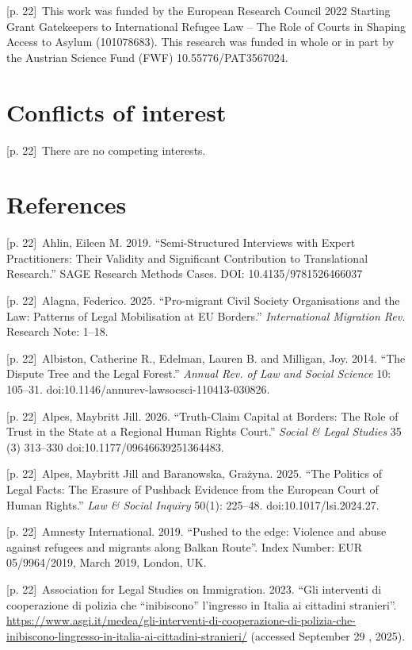 \documentclass[10pt,a4paper]{article}
\begin{document}
{\scriptsize\color{gray} [p. 22]}\ This work was funded by the European Research Council 2022 Starting Grant Gatekeepers to International Refugee Law – The Role of Courts in Shaping Access to Asylum (101078683). This research was funded in whole or in part by the Austrian Science Fund (FWF) 10.55776/PAT3567024.\par
{}\section*{Conflicts of interest}
{\scriptsize\color{gray} [p. 22]}\ There are no competing interests.\par
{}\section*{References}
{\scriptsize\color{gray} [p. 22]}\ Ahlin, Eileen M. 2019. “Semi-Structured Interviews with Expert Practitioners: Their Validity and Significant Contribution to Translational Research.” SAGE Research Methods Cases. DOI: 10.4135/9781526466037\par
{\scriptsize\color{gray} [p. 22]}\ Alagna, Federico. 2025. “Pro-migrant Civil Society Organisations and the Law: Patterns of Legal Mobilisation at EU Borders.” \textit{International Migration Rev.} Research Note: 1–18.\par
{\scriptsize\color{gray} [p. 22]}\ Albiston, Catherine R., Edelman, Lauren B. and Milligan, Joy. 2014. “The Dispute Tree and the Legal Forest.” \textit{Annual Rev. of Law and Social Science} 10: 105–31. doi:10.1146/annurev-lawsocsci-110413-030826.\par
{\scriptsize\color{gray} [p. 22]}\ Alpes, Maybritt Jill. 2026. “Truth-Claim Capital at Borders: The Role of Trust in the State at a Regional Human Rights Court.” \textit{Social \& Legal Studies} 35 (3) 313–330 doi:10.1177/09646639251364483.\par
{\scriptsize\color{gray} [p. 22]}\ Alpes, Maybritt Jill and Baranowska, Grażyna. 2025. “The Politics of Legal Facts: The Erasure of Pushback Evidence from the European Court of Human Rights.” \textit{Law \& Social Inquiry} 50(1): 225–48. doi:10.1017/lsi.2024.27.\par
{\scriptsize\color{gray} [p. 22]}\ Amnesty International. 2019. “Pushed to the edge: Violence and abuse against refugees and migrants along Balkan Route”. Index Number: EUR 05/9964/2019, March 2019, London, UK.\par
{\scriptsize\color{gray} [p. 22]}\ Association for Legal Studies on Immigration. 2023. “Gli interventi di cooperazione di polizia che “inibiscono” l’ingresso in Italia ai cittadini stranieri”. \url{https://www.asgi.it/medea/gli-interventi-di-cooperazione-di-polizia-che-inibiscono-lingresso-in-italia-ai-cittadini-stranieri/} (accessed September 29 , 2025).\par
\end{document}
